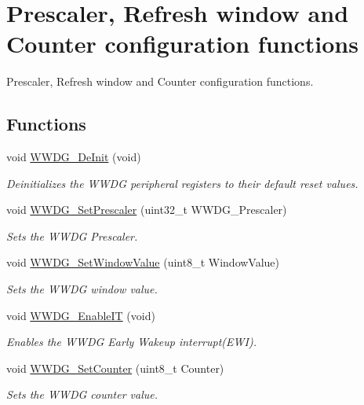 \hypertarget{group___w_w_d_g___group1}{\section{Prescaler, Refresh window and Counter configuration functions}
\label{group___w_w_d_g___group1}
}


Prescaler, Refresh window and Counter configuration functions.  


\subsection*{Functions}
\begin{DoxyCompactItemize}
\item 
void \hyperlink{group___w_w_d_g___group1_ga7130f4dc861b9234b62e73f9f57f89a1}{W\-W\-D\-G\-\_\-\-De\-Init} (void)
\begin{DoxyCompactList}\small\item\em Deinitializes the W\-W\-D\-G peripheral registers to their default reset values. \end{DoxyCompactList}\item 
void \hyperlink{group___w_w_d_g___group1_gafeaa2b52c31ba7baca7eb61d2d42e07b}{W\-W\-D\-G\-\_\-\-Set\-Prescaler} (uint32\-\_\-t W\-W\-D\-G\-\_\-\-Prescaler)
\begin{DoxyCompactList}\small\item\em Sets the W\-W\-D\-G Prescaler. \end{DoxyCompactList}\item 
void \hyperlink{group___w_w_d_g___group1_gaf44a7bf8bf6b11b41cd89ff521fdd5a5}{W\-W\-D\-G\-\_\-\-Set\-Window\-Value} (uint8\-\_\-t Window\-Value)
\begin{DoxyCompactList}\small\item\em Sets the W\-W\-D\-G window value. \end{DoxyCompactList}\item 
void \hyperlink{group___w_w_d_g___group1_gac8af66ea5254d3d78b60b9b7c7f29521}{W\-W\-D\-G\-\_\-\-Enable\-I\-T} (void)
\begin{DoxyCompactList}\small\item\em Enables the W\-W\-D\-G Early Wakeup interrupt(\-E\-W\-I). \end{DoxyCompactList}\item 
void \hyperlink{group___w_w_d_g___group1_ga6e44cc35f133b28b9ad861f459bf8d76}{W\-W\-D\-G\-\_\-\-Set\-Counter} (uint8\-\_\-t Counter)
\begin{DoxyCompactList}\small\item\em Sets the W\-W\-D\-G counter value. \end{DoxyCompactList}\end{DoxyCompactItemize}


